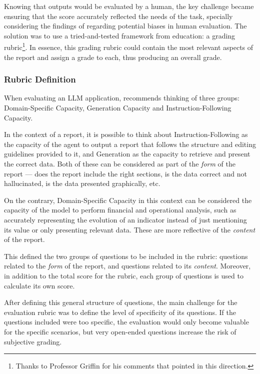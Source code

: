 \documentclass[a4paper]{report}
\begin{document}
Knowing that outputs would be evaluated by a human, the key challenge became ensuring that the score accurately reflected the needs of the task, specially considering the findings of \cite{hu2023decipher} regarding potential biases in human evaluation. The solution was to use a tried-and-tested framework from education: a grading rubric\footnote{Thanks to Professor Griffin for his comments that pointed in this direction.}. In essence, this grading rubric could contain the most relevant aspects of the report and assign a grade to each, thus producing an overall grade. 

\subsubsection{Rubric Definition}

When evaluating an LLM application, \cite{aiebook2025} recommends thinking of three groups: Domain-Specific Capacity, Generation Capacity and Instruction-Following Capacity.

In the context of a report, it is possible to think about Instruction-Following as the capacity of the agent to output a report that follows the structure and editing guidelines provided to it, and Generation as the capacity to retrieve and present the correct data. Both of these can be considered as part of the \textit{form} of the report --- does the report include the right sections, is the data correct and not hallucinated, is the data presented graphically, etc.

On the contrary, Domain-Specific Capacity in this context can be considered the capacity of the model to perform financial and operational analysis, such as accurately representing the evolution of an indicator instead of just mentioning its value or only presenting relevant data. These are more reflective of the \textit{content} of the report.

This defined the two groups of questions to be included in the rubric: questions related to the \textit{form} of the report, and questions related to its \textit{content}. Moreover, in addition to the total score for the rubric, each group of questions is used to calculate its own score.

After defining this general structure of questions, the main challenge for the evaluation rubric was to define the level of specificity of its questions. If the questions included were too specific, the evaluation would only become valuable for the specific scenarios, but very open-ended questions increase the risk of subjective grading.
\end{document}
